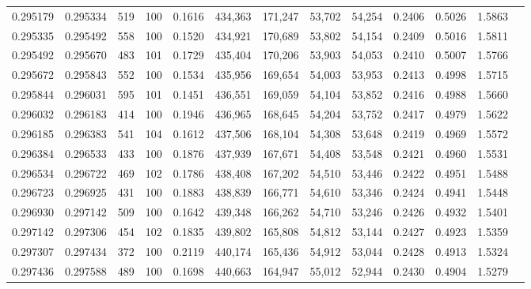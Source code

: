 \begin{tabular}{rrrrrrrrrrrrr}
0.295179 & 0.295334 &   519 & 100 &                                     0.1616 & 434,363 & 171,247 &  53,702 &  54,254 & 0.2406 & 0.5026 & 1.5863 \\
0.295335 & 0.295492 &   558 & 100 &                                     0.1520 & 434,921 & 170,689 &  53,802 &  54,154 & 0.2409 & 0.5016 & 1.5811 \\
0.295492 & 0.295670 &   483 & 101 &                                     0.1729 & 435,404 & 170,206 &  53,903 &  54,053 & 0.2410 & 0.5007 & 1.5766 \\
0.295672 & 0.295843 &   552 & 100 &                                     0.1534 & 435,956 & 169,654 &  54,003 &  53,953 & 0.2413 & 0.4998 & 1.5715 \\
0.295844 & 0.296031 &   595 & 101 &                                     0.1451 & 436,551 & 169,059 &  54,104 &  53,852 & 0.2416 & 0.4988 & 1.5660 \\
0.296032 & 0.296183 &   414 & 100 &                                     0.1946 & 436,965 & 168,645 &  54,204 &  53,752 & 0.2417 & 0.4979 & 1.5622 \\
0.296185 & 0.296383 &   541 & 104 &                                     0.1612 & 437,506 & 168,104 &  54,308 &  53,648 & 0.2419 & 0.4969 & 1.5572 \\
0.296384 & 0.296533 &   433 & 100 &                                     0.1876 & 437,939 & 167,671 &  54,408 &  53,548 & 0.2421 & 0.4960 & 1.5531 \\
0.296534 & 0.296722 &   469 & 102 &                                     0.1786 & 438,408 & 167,202 &  54,510 &  53,446 & 0.2422 & 0.4951 & 1.5488 \\
0.296723 & 0.296925 &   431 & 100 &                                     0.1883 & 438,839 & 166,771 &  54,610 &  53,346 & 0.2424 & 0.4941 & 1.5448 \\
0.296930 & 0.297142 &   509 & 100 &                                     0.1642 & 439,348 & 166,262 &  54,710 &  53,246 & 0.2426 & 0.4932 & 1.5401 \\
0.297142 & 0.297306 &   454 & 102 &                                     0.1835 & 439,802 & 165,808 &  54,812 &  53,144 & 0.2427 & 0.4923 & 1.5359 \\
0.297307 & 0.297434 &   372 & 100 &                                     0.2119 & 440,174 & 165,436 &  54,912 &  53,044 & 0.2428 & 0.4913 & 1.5324 \\
0.297436 & 0.297588 &   489 & 100 &                                     0.1698 & 440,663 & 164,947 &  55,012 &  52,944 & 0.2430 & 0.4904 & 1.5279 \\

\end{tabular}
